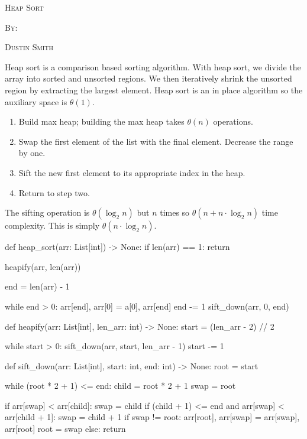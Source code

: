 \documentclass[12pt,dvipsnames,svgnames,x11names]{article}
\begin{document}
%
\pagecolor{gray!50}
\begin{center}
  \begin{center}
  \vspace*{\fill}
  \textsc{\LARGE Heap Sort}
  \par\bigskip
  \textsc{By:}
  \par\bigskip
  \textsc{\LARGE Dustin Smith}
  \vspace*{\fill}
\end{center}
\end{center}

\newpage

Heap sort is a comparison based sorting algorithm. With heap sort, we divide the array into sorted and
unsorted regions. We then iteratively shrink the unsorted region by extracting the largest element.
Heap sort is an in place algorithm so the auxiliary space is \(\theta(1)\).
\begin{enumerate}
	\item Build max heap; building the max heap takes \(\theta(n)\) operations.
	\item Swap the first element of the list with the final element. Decrease the range by one.
	\item Sift the new first element to its appropriate index in the heap.
	\item Return to step two.
\end{enumerate} 
The sifting operation is \(\theta(\log_2 n)\) but \(n\) times so \(\theta(n + n\cdot\log_2 n)\) time complexity.
This is simply \(\theta(n\cdot\log_2 n)\).
\begin{python}
def heap_sort(arr: List[int]) -> None:
  if len(arr) == 1:
    return
    
  heapify(arr, len(arr))
  
  end = len(arr) - 1
  
  while end > 0:
    arr[end], arr[0] = a[0], arr[end]
    end -= 1
    sift_down(arr, 0, end)
    
    
def heapify(arr: List[int], len_arr: int) -> None:
  start = (len_arr - 2) // 2
  
  while start > 0:
    sift_down(arr, start, len_arr - 1)
    start -= 1
    
    
def sift_down(arr: List[int], start: int, end: int) -> None:
  root = start
  
  while (root * 2 + 1) <= end:
    child = root * 2 + 1
    swap = root
    
    if arr[swap] < arr[child]:
      swap = child
    if (child + 1) <= end and arr[swap] < arr[child + 1]:
      swap = child + 1
    if swap != root:
      arr[root], arr[swap] = arr[swap], arr[root]
      root = swap
    else:
      return
\end{python}
\end{document}
